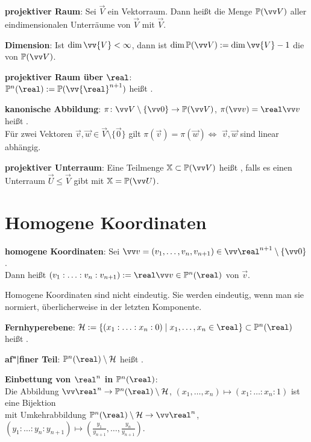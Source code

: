\textbf{projektiver Raum}:
Sei $\vec{V}$ ein Vektorraum.
Dann heißt die Menge $\PP(\vec{V})$ aller eindimensionalen Unterräume von $\vec{V}$
 mit  $\vec{V}$.

\textbf{Dimension}:
Ist $\dim \vv{V} < \infty$, dann ist $\dim \PP(\vec{V}) := \dim \vv{V} - 1$ die
 von $\PP(\vec{V})$.

\textbf{projektiver Raum über $\real$}:\\
$\PP^n(\real) := \PP(\vv{\real}^{n+1})$ heißt
.

\textbf{kanonische Abbildung}:
$\pi\colon \vec{V} \setminus \{\vec{0}\} \to \PP(\vec{V})$, $\pi(\vec{v}) = \real\vec{v}$
heißt .\\
Für zwei Vektoren $\vec{v}, \vec{w} \in \vec{V} \setminus \{\vec{0}\}$ gilt
$\pi(\vec{v}) = \pi(\vec{w}) \iff$ $\vec{v}, \vec{w}$ sind linear abhängig.

\textbf{projektiver Unterraum}:
Eine Teilmenge $\XX \subset \PP(\vec{V})$ heißt ,
falls es einen Unterraum $\vec{U} \le \vec{V}$ gibt mit $\XX = \PP(\vec{U})$.

\section{%
    Homogene Koordinaten%
}

\textbf{homogene Koordinaten}:
Sei $\vec{v} = (v_1, \dotsc, v_n, v_{n+1}) \in \vec{\real}^{n+1} \setminus \{\vec{0}\}$.\\
Dann heißt $(v_1 : \dotsc : v_n : v_{n+1}) := \real\vec{v} \in \PP^n(\real)$
 von $\vec{v}$.

Homogene Koordinaten sind nicht eindeutig.
Sie werden eindeutig, wenn man sie normiert,
überlicherweise in der letzten Komponente.

\textbf{Fernhyperebene}:
$\H := \{(x_1 : \dotsc : x_n : 0) \;|\; x_1, \dotsc, x_n \in \real\} \subset \PP^n(\real)$
heißt .

\textbf{af"|finer Teil}:
$\PP^n(\real) \setminus \H$ heißt .

\textbf{Einbettung von $\real^n$ in $\PP^n(\real)$}:\\
Die Abbildung
$\vec{\real}^n \to \PP^n(\real) \setminus \H$,
$(x_1, \dotsc, x_n) \mapsto (x_1 : \dotsc : x_n : 1)$
ist eine Bijektion\\
mit Umkehrabbildung
$\PP^n(\real) \setminus \H \to \vec{\real}^n$,
$(y_1 : \dotsc : y_n : y_{n+1}) \mapsto (\frac{y_1}{y_{n+1}}, \dotsc, \frac{y_n}{y_{n+1}})$.

